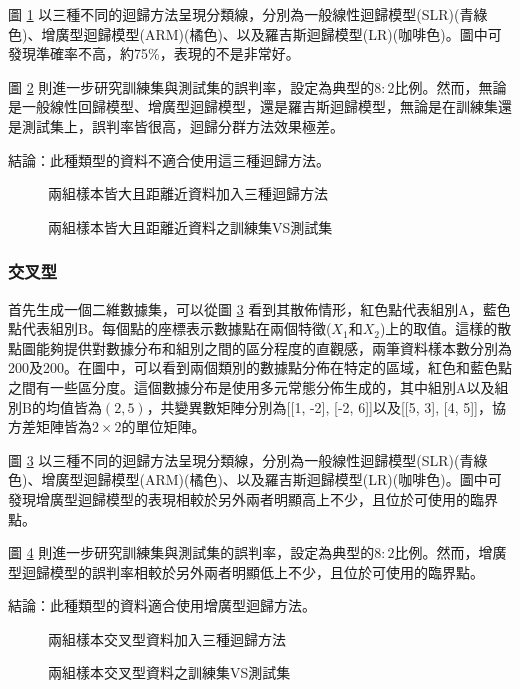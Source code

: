 \documentclass[12pt, a4paper]{article}
\begin{document}
圖 \ref{fig:rdn13-LARline} 以三種不同的迴歸方法呈現分類線，分別為一般線性迴歸模型(SLR)(青綠色)、增廣型迴歸模型(ARM)(橘色)、以及羅吉斯迴歸模型(LR)(咖啡色)。圖中可發現準確率不高，約75\%，表現的不是非常好。

圖 \ref{fig:rdn13-LARline2} 則進一步研究訓練集與測試集的誤判率，設定為典型的$8:2$比例。然而，無論是一般線性回歸模型、增廣型迴歸模型，還是羅吉斯迴歸模型，無論是在訓練集還是測試集上，誤判率皆很高，迴歸分群方法效果極差。

結論：此種類型的資料不適合使用這三種迴歸方法。
\begin{figure}[H]
    \caption{兩組樣本皆大且距離近資料加入三種迴歸方法}
    \label{fig:rdn13-LARline}
\end{figure}
\begin{figure}[H]
    \caption{兩組樣本皆大且距離近資料之訓練集VS測試集}
    \label{fig:rdn13-LARline2}
\end{figure}
\subsubsection{交叉型}
首先生成一個二維數據集，可以從圖 \ref{fig:rdn14-LARline} 看到其散佈情形，紅色點代表組別A，藍色點代表組別B。每個點的座標表示數據點在兩個特徵($X_1$和$X_2$)上的取值。這樣的散點圖能夠提供對數據分布和組別之間的區分程度的直觀感，兩筆資料樣本數分別為200及200。在圖中，可以看到兩個類別的數據點分佈在特定的區域，紅色和藍色點之間有一些區分度。這個數據分布是使用多元常態分佈生成的，其中組別A以及組別B的均值皆為$(2, 5)$，共變異數矩陣分別為[[1, -2], [-2, 6]]以及[[5, 3], [4, 5]]，協方差矩陣皆為$2 \times 2$的單位矩陣。

圖 \ref{fig:rdn14-LARline} 以三種不同的迴歸方法呈現分類線，分別為一般線性迴歸模型(SLR)(青綠色)、增廣型迴歸模型(ARM)(橘色)、以及羅吉斯迴歸模型(LR)(咖啡色)。圖中可發現增廣型迴歸模型的表現相較於另外兩者明顯高上不少，且位於可使用的臨界點。

圖 \ref{fig:rdn14-LARline2} 則進一步研究訓練集與測試集的誤判率，設定為典型的$8:2$比例。然而，增廣型迴歸模型的誤判率相較於另外兩者明顯低上不少，且位於可使用的臨界點。

結論：此種類型的資料適合使用增廣型迴歸方法。
\begin{figure}[H]
    \caption{兩組樣本交叉型資料加入三種迴歸方法}
    \label{fig:rdn14-LARline}
\end{figure}
\begin{figure}[H]
    \caption{兩組樣本交叉型資料之訓練集VS測試集}
    \label{fig:rdn14-LARline2}
\end{figure}
\end{document}
